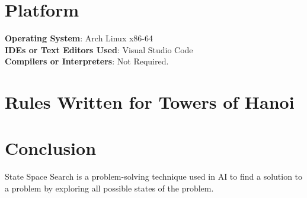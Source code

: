\documentclass[11pt]{article}
\begin{document}
\section{Platform}
\textbf{Operating System}: Arch Linux x86-64 \\
\textbf{IDEs or Text Editors Used}: Visual Studio Code\\
\textbf{Compilers or Interpreters}: Not Required. \\

\section{Rules Written for Towers of Hanoi}




% 

\section{Conclusion}
State Space Search is a problem-solving technique used in AI to find a solution
to a problem by exploring all possible states of the problem.

\clearpage
\end{document}
